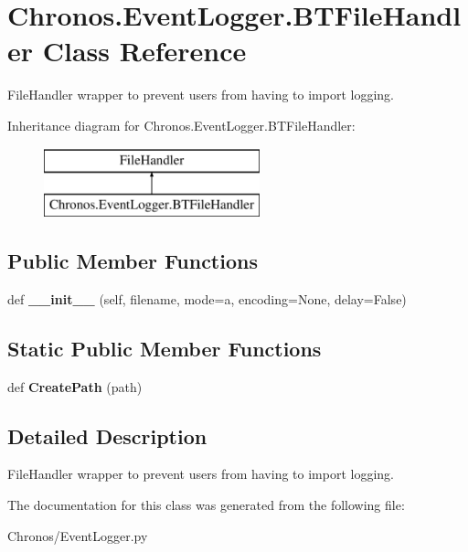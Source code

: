 \hypertarget{classChronos_1_1EventLogger_1_1BTFileHandler}{}\section{Chronos.\+Event\+Logger.\+B\+T\+File\+Handler Class Reference}
\label{classChronos_1_1EventLogger_1_1BTFileHandler}


File\+Handler wrapper to prevent users from having to import logging.  


Inheritance diagram for Chronos.\+Event\+Logger.\+B\+T\+File\+Handler\+:\begin{figure}[H]
\begin{center}
\leavevmode
\includegraphics[height=2.000000cm]{classChronos_1_1EventLogger_1_1BTFileHandler}
\end{center}
\end{figure}
\subsection*{Public Member Functions}
\begin{DoxyCompactItemize}
\item 
def {\bfseries \+\_\+\+\_\+init\+\_\+\+\_\+} (self, filename, mode=\textquotesingle{}a\textquotesingle{}, encoding=None, delay=False)
\end{DoxyCompactItemize}
\subsection*{Static Public Member Functions}
\begin{DoxyCompactItemize}
\item 
def {\bfseries Create\+Path} (path)
\end{DoxyCompactItemize}


\subsection{Detailed Description}
File\+Handler wrapper to prevent users from having to import logging. 

The documentation for this class was generated from the following file\+:\begin{DoxyCompactItemize}
\item 
Chronos/Event\+Logger.\+py\end{DoxyCompactItemize}
